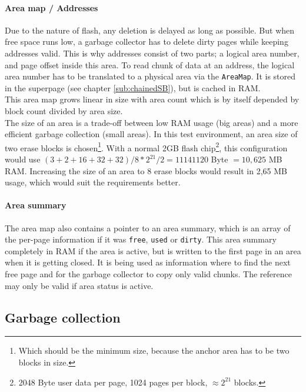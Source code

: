 \paragraph{Area map / Addresses}
Due to the nature of flash, any deletion is delayed as long as possible. But when free space runs low, a garbage collector has to delete dirty pages while keeping addresses valid. This is why addresses consist of two parts; a logical area number, and page offset inside this area. To read chunk of data at an address, the logical area number has to be translated to a physical area via the \texttt{AreaMap}. It is stored in the superpage (see chapter \ref{sub:chainedSB}), but is cached in RAM.\\
This area map grows linear in size with area count which is by itself depended by block count divided by area size.\\
The size of an area is a trade-off between low RAM usage (big areas) and a more efficient garbage collection (small areas). In this test environment, an area size of two erase blocks is chosen\footnote{Which should be the minimum size, because the anchor area has to be two blocks in size.}. With a normal 2GB flash chip\footnote{2048 Byte user data per page, 1024 pages per block, $\approx 2^21$ blocks.}, this configuration would use $(3+2+16+32+32) / 8 * 2^{21} / 2 = 11141120$ Byte $= 10,625$ MB RAM. Increasing the size of an area to 8 erase blocks would result in 2,65 MB usage, which would suit the requirements better.

\paragraph{Area summary}
The area map also contains a pointer to an area summary, which is an array of the per-page information if it was \texttt{free}, \texttt{used} or \texttt{dirty}. This area summary completely in RAM if the area is active, but is written to the first page in an area when it is getting closed. It is being used as information where to find the next free page and for the garbage collector to copy only valid chunks. The reference may only be valid if area status is active.

\subsection{Garbage collection}
